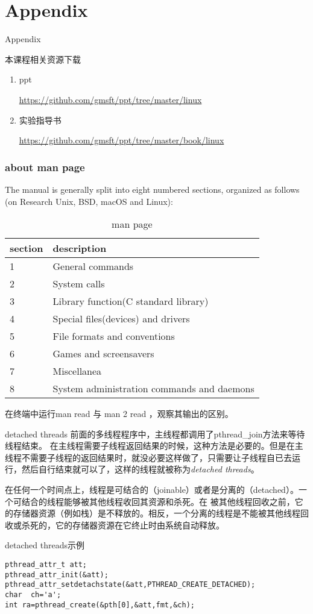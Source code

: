 \documentclass{beamer}
\begin{document}
\section{Appendix}
\begin{frame}
\Huge{\centerline{Appendix}}
\end{frame}
\begin{frame}{本课程相关资源下载}
\begin{enumerate}
\item
ppt

\url{https://github.com/gmsft/ppt/tree/master/linux}
\item
实验指导书

\url{https://github.com/gmsft/ppt/tree/master/book/linux}
\end{enumerate}
\end{frame}
\begin{frame}
\frametitle{about man page}
The manual is generally split into eight numbered sections, organized as follows (on Research Unix, BSD, macOS and Linux):
\begin{table}
\begin{tabular}{ll}
\toprule
\textbf{section} & \textbf{description} \\
\midrule
1 & General commands\\
2 & System calls\\
3 & Library function(C standard library)\\
4 & Special files(devices) and drivers\\
5 & File formats and conventions\\
6 & Games and screensavers\\
7 & Miscellanea\\
8 & System administration commands and daemons\\  
\bottomrule
\end{tabular}
\caption{man page}
\end{table}

在终端中运行man read 与 man 2 read ，观察其输出的区别。
\end{frame}
\begin{frame}{detached threads}
前面的多线程程序中，主线程都调用了pthread\_join方法来等待线程结束。
在主线程需要子线程返回结果的时候，这种方法是必要的。但是在主线程不需要子线程的返回结果时，就没必要这样做了，只需要让子线程自已去运行，然后自行结束就可以了，这样的线程就被称为\emph{detached threads}。

在任何一个时间点上，线程是可结合的（joinable）或者是分离的（detached）。一个可结合的线程能够被其他线程收回其资源和杀死。在 被其他线程回收之前，它的存储器资源（例如栈）是不释放的。相反，一个分离的线程是不能被其他线程回收或杀死的，它的存储器资源在它终止时由系统自动释放。
\end{frame}
\begin{frame}[fragile]{detached threads示例}
\begin{verbatim}
pthread_attr_t att;
pthread_attr_init(&att);
pthread_attr_setdetachstate(&att,PTHREAD_CREATE_DETACHED);
char  ch='a';
int ra=pthread_create(&pth[0],&att,fmt,&ch);

\end{verbatim}
\end{frame}
\end{document}

